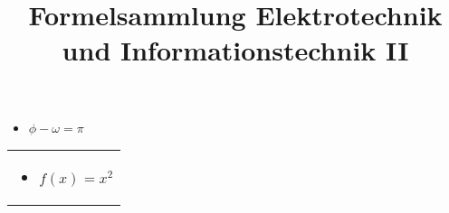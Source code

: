 \documentclass{tudexercise}
\begin{document}
	\title{Formelsammlung Elektrotechnik und Informationstechnik II}
	\date{}
	\author{}
	\maketitle
	
\begin{minipage}[t]{0,45 \textwidth}
	\begin{itemize}
		\item $\phi - \omega = \pi$
	\end{itemize}
\end{minipage}%
\hfill
\begin{minipage}[t]{0,45 \textwidth}
	\begin{tabular}{|p{\textwidth}}
		\begin{itemize}
			\item $f(x) = x^2$
		\end{itemize}
		
	\end{tabular}
\end{minipage}%
\end{document}
